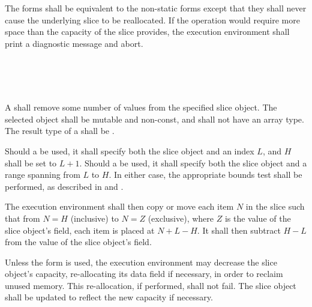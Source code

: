 \specsubsubitem
The  forms shall be equivalent to the non-static forms except
that they shall never cause the underlying slice to be reallocated. If the
operation would require more space than the capacity of the slice provides, the
execution environment shall print a diagnostic message and abort.


\begin{grammar}
 \\
	  \terminal{(}  \terminal{)} \\
	  \terminal{(}  \terminal{)} \\
\end{grammar}

\specsubsubitem
A  shall remove some number of values from the
specified slice object. The selected object shall be mutable and non-const, and
shall not have an array type. The result type of a
 shall be .

\specsubsubitem
Should a  be used, it shall specify both the
slice object and an index $L$, and $H$ shall be set to $L+1$. Should a
 be used, it shall specify both the slice object
and a range spanning from $L$ to $H$. In either case, the appropriate bounds
test shall be performed, as described in  and
.

\specsubsubitem
The execution environment shall then copy or move each item $N$ in the slice
such that from $N=H$ (inclusive) to $N=Z$ (exclusive), where $Z$ is the value of
the slice object's  field, each item is placed at $N+L-H$. It shall
then subtract $H-L$ from the value of the slice object's  field.

\specsubsubitem
Unless the  form is used, the execution environment may
decrease the slice object's capacity, re-allocating its data field if necessary,
in order to reclaim unused memory. This re-allocation, if performed, shall not
fail. The slice object shall be updated to reflect the new capacity if
necessary.


\begin{grammar}
 \\
	  \\
	 \terminal{!} \\
\end{grammar}

